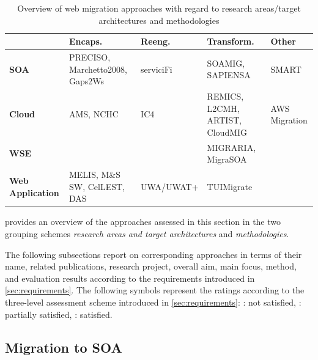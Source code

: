 \hypertarget{tbl:sota-groups}{}
\begin{table}[h]
  \caption[Overview of assessed web migration approaches]{Overview of web migration approaches with regard to
research areas/target architectures and methodologies}
  \label{tbl:sota-groups}
  \centering
    \begin{tabularx}{0.98\linewidth}{ XXXXX } 
    \toprule
    & \textbf{Encaps.} & \textbf{Reeng.} & \textbf{Transform.} & \textbf{Other}\\
    \midrule
    \textbf{SOA} & PRECISO, Marchetto2008, Gaps2Ws & serviciFi & SOAMIG, SAPIENSA & SMART\footnotemark\\
    \textbf{Cloud} & AMS, NCHC & IC4 & REMICS, L2CMH, ARTIST, CloudMIG & AWS Migration\footnotemark\\
    \textbf{WSE} & & & MIGRARIA, MigraSOA &\\
    \textbf{Web Application} & MELIS, M\&S SW, CelLEST, DAS & UWA/UWAT+ & TUIMigrate &\\
    \bottomrule
    \end{tabularx}
\end{table}
\addtocounter{footnote}{-1}
\addtocounter{footnote}{1}

 provides an overview of the approaches assessed in this section in the two grouping schemes \emph{research areas and target architectures} and \emph{methodologies}.


The following subsections report on corresponding approaches in terms of their name, related publications, research project, overall aim, main focus, method, and evaluation results according to the requirements introduced in \cref{sec:requirements}. The following symbols represent the ratings according to the three-level assessment scheme introduced in \ref{sec:requirements}: \Circle : not satisfied, \LEFTcircle : partially satisfied, \CIRCLE : satisfied.

\vspace{-10pt}
\hypertarget{sec:soa-migration}{%
\subsection{Migration to SOA}\label{sec:soa-migration}}
\vspace{10pt}

